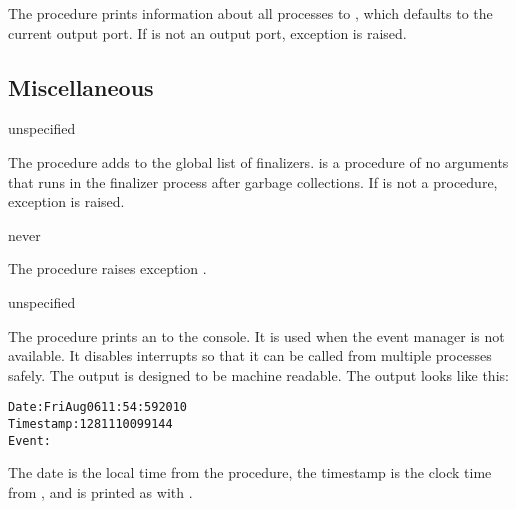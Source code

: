 The  procedure prints information about all processes to
, which defaults to the current output port. If  is
not an output port, exception  is
raised.

\subsection{Miscellaneous}

\begin{procedure}
\end{procedure}
\returns{} unspecified

The  procedure adds
 to the global list of finalizers.  is a
procedure of no arguments that runs in the finalizer process after
garbage collections. If  is not a procedure, exception
 is raised.

\begin{procedure}
\end{procedure}
\returns{} never

The  procedure raises exception .

\begin{procedure}
\end{procedure}
\returns{} unspecified

The  procedure prints an  to
the console. It is used when the event manager is not available. It
disables interrupts so that it can be called from multiple processes
safely.  The output is designed to be machine readable. The output
looks like this:

\begin{alltt}
Date: Fri Aug 06 11:54:59 2010
Timestamp: 1281110099144
Event: 
\end{alltt}

The date is the local time from the  procedure,
the timestamp is the clock time from , and
 is printed as with .

